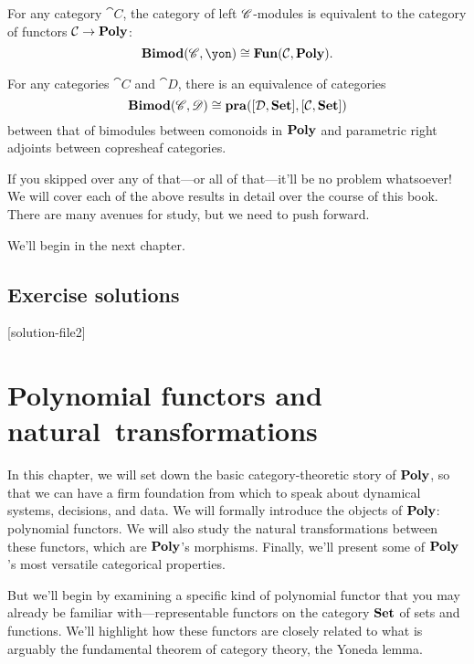 \documentclass[Book-Poly]{subfiles}
\begin{document}
\begin{proposition}
For any category $\cat{C}$, the category of left $\mathscr{C}$-modules is equivalent to the category of functors $\mathcal{C}\to\mathbf{Poly}$:
\[\Cat{Bimod}(\com{C},\yon)\cong\Cat{Fun}(\cat{C},\poly).\]
\end{proposition}

\begin{proposition}[Garner]
For any categories $\cat{C}$ and $\cat{D}$, there is an equivalence of categories
\[
\mathbf{Bimod}(\mathscr{C},\mathscr{D})\cong\mathbf{pra}([\mathcal{D},\mathbf{Set}],[\mathcal{C},\mathbf{Set}])
\]
between that of bimodules between comonoids in $\mathbf{Poly}$ and parametric right adjoints between copresheaf categories.
\end{proposition}

If you skipped over any of that---or all of that---it'll be no problem whatsoever! We will cover each of the above results in detail over the course of this book. There are many avenues for study, but we need to push forward.

We'll begin in the next chapter.

\section{Exercise solutions}
{\footnotesize
}

[solution-file2]

\chapter{Polynomial functors and natural~transformations} \label{ch.poly.func_nat}

In this chapter, we will set down the basic category-theoretic story of $\mathbf{Poly}$, so that we can have a firm foundation from which to speak about dynamical systems, decisions, and data. 
We will formally introduce the objects of $\mathbf{Poly}$: polynomial functors.
We will also study the natural transformations between these functors, which are $\mathbf{Poly}$'s morphisms.
Finally, we'll present some of $\mathbf{Poly}$'s most versatile categorical properties.

But we'll begin by examining a specific kind of polynomial functor that you may already be familiar with---representable functors on the category $\mathbf{Set}$ of sets and functions.
We'll highlight how these functors are closely related to what is arguably the fundamental theorem of category theory, the Yoneda lemma.
\end{document}
